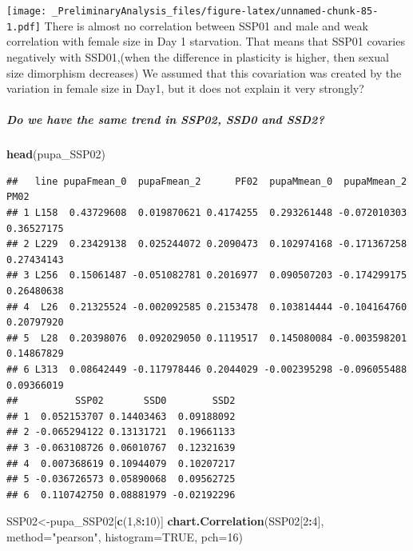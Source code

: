 \documentclass[
]{article}
\newenvironment{Shaded}{\begin{snugshade}}{\end{snugshade}}
\newcommand{\DataTypeTok}[1]{\textcolor[rgb]{0.13,0.29,0.53}{#1}}
\newcommand{\DecValTok}[1]{\textcolor[rgb]{0.00,0.00,0.81}{#1}}
\newcommand{\KeywordTok}[1]{\textcolor[rgb]{0.13,0.29,0.53}{\textbf{#1}}}
\newcommand{\NormalTok}[1]{#1}
\newcommand{\OperatorTok}[1]{\textcolor[rgb]{0.81,0.36,0.00}{\textbf{#1}}}
\newcommand{\OtherTok}[1]{\textcolor[rgb]{0.56,0.35,0.01}{#1}}
\newcommand{\StringTok}[1]{\textcolor[rgb]{0.31,0.60,0.02}{#1}}
\begin{document}
\texttt{[image: \_PreliminaryAnalysis\_files/figure-latex/unnamed-chunk-85-1.pdf]}
There is almost no correlation between SSP01 and male and weak
correlation with female size in Day 1 starvation. That means that SSP01
covaries negatively with SSD01,(when the difference in plasticity is
higher, then sexual size dimorphism decreases) We assumed that this
covariation was created by the variation in female size in Day1, but it
does not explain it very strongly?

\hypertarget{do-we-have-the-same-trend-in-ssp02-ssd0-and-ssd2}{%
\subparagraph{Do we have the same trend in SSP02, SSD0 and
SSD2?}\label{do-we-have-the-same-trend-in-ssp02-ssd0-and-ssd2}}

\begin{Shaded}
\begin{Highlighting}[]
\KeywordTok{head}\NormalTok{(pupa_SSP02)}
\end{Highlighting}
\end{Shaded}

\begin{verbatim}
##   line pupaFmean_0  pupaFmean_2      PF02  pupaMmean_0  pupaMmean_2       PM02
## 1 L158  0.43729608  0.019870621 0.4174255  0.293261448 -0.072010303 0.36527175
## 2 L229  0.23429138  0.025244072 0.2090473  0.102974168 -0.171367258 0.27434143
## 3 L256  0.15061487 -0.051082781 0.2016977  0.090507203 -0.174299175 0.26480638
## 4  L26  0.21325524 -0.002092585 0.2153478  0.103814444 -0.104164760 0.20797920
## 5  L28  0.20398076  0.092029050 0.1119517  0.145080084 -0.003598201 0.14867829
## 6 L313  0.08642449 -0.117978446 0.2044029 -0.002395298 -0.096055488 0.09366019
##          SSP02       SSD0        SSD2
## 1  0.052153707 0.14403463  0.09188092
## 2 -0.065294122 0.13131721  0.19661133
## 3 -0.063108726 0.06010767  0.12321639
## 4  0.007368619 0.10944079  0.10207217
## 5 -0.036726573 0.05890068  0.09562725
## 6  0.110742750 0.08881979 -0.02192296
\end{verbatim}

\begin{Shaded}
\begin{Highlighting}[]
\NormalTok{SSP02<-pupa_SSP02[}\KeywordTok{c}\NormalTok{(}\DecValTok{1}\NormalTok{,}\DecValTok{8}\OperatorTok{:}\DecValTok{10}\NormalTok{)]}
\KeywordTok{chart.Correlation}\NormalTok{(SSP02[}\DecValTok{2}\OperatorTok{:}\DecValTok{4}\NormalTok{],}
                   \DataTypeTok{method=}\StringTok{"pearson"}\NormalTok{,}
                   \DataTypeTok{histogram=}\OtherTok{TRUE}\NormalTok{,}
                   \DataTypeTok{pch=}\DecValTok{16}\NormalTok{)}
\end{Highlighting}
\end{Shaded}
\end{document}
